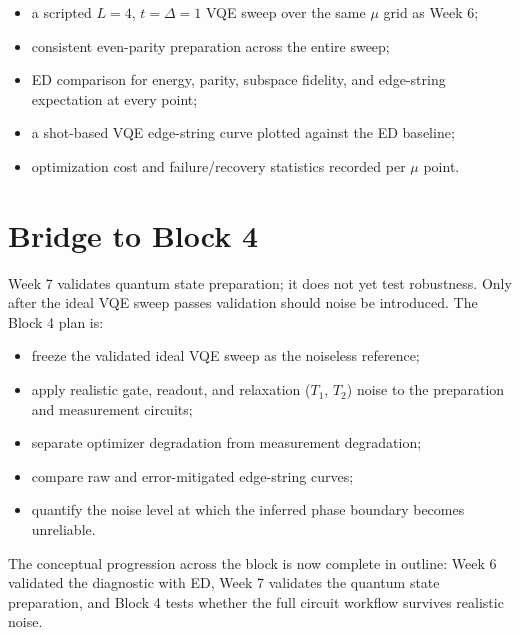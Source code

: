 \documentclass[11pt]{article}
\begin{document}
\begin{itemize}
  \item a scripted $L=4$, $t=\Delta=1$ VQE sweep over the same $\mu$ grid as Week 6;
  \item consistent even-parity preparation across the entire sweep;
  \item ED comparison for energy, parity, subspace fidelity, and edge-string expectation at every point;
  \item a shot-based VQE edge-string curve plotted against the ED baseline;
  \item optimization cost and failure/recovery statistics recorded per $\mu$ point.
\end{itemize}

\section{Bridge to Block 4}

Week 7 validates quantum state preparation; it does not yet test robustness. Only after the ideal VQE sweep passes validation should noise be introduced. The Block 4 plan is:
\begin{itemize}
  \item freeze the validated ideal VQE sweep as the noiseless reference;
  \item apply realistic gate, readout, and relaxation ($T_1$, $T_2$) noise to the preparation and measurement circuits;
  \item separate optimizer degradation from measurement degradation;
  \item compare raw and error-mitigated edge-string curves;
  \item quantify the noise level at which the inferred phase boundary becomes unreliable.
\end{itemize}

The conceptual progression across the block is now complete in outline: Week 6 validated the diagnostic with ED, Week 7 validates the quantum state preparation, and Block 4 tests whether the full circuit workflow survives realistic noise.
\end{document}
